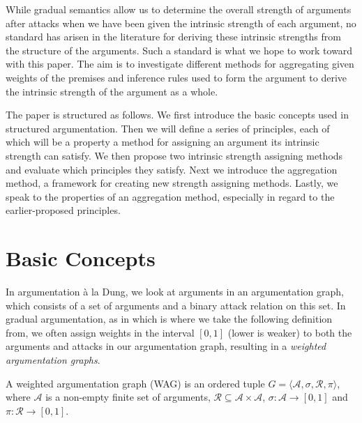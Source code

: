 \documentclass[runningheads]{llncs}
\begin{document}
While gradual semantics allow us to determine the overall strength of arguments after attacks when we have been given the intrinsic strength of each argument, no standard has arisen in the literature for deriving these intrinsic strengths from the structure of the arguments. Such a standard is what we hope to work toward with this paper. The aim is to investigate different methods for aggregating given weights of the premises and inference rules used to form the argument to derive the intrinsic strength of the argument as a whole.

The paper is structured as follows. We first introduce the basic concepts used in structured argumentation. Then we will define a series of principles, each of which will be a property a method for assigning an argument its intrinsic strength can satisfy. We then propose two intrinsic strength assigning methods and evaluate which principles they satisfy. Next we introduce the aggregation method, a framework for creating new strength assigning methods. Lastly, we speak to the properties of an aggregation method, especially in regard to the earlier-proposed principles.
%
\section{Basic Concepts}
In argumentation à la Dung, we look at arguments in an argumentation graph, which consists of a set of arguments and a binary attack relation on this set. In gradual argumentation, as in \cite{DBLP:conf/atal/AmgoudD19} which is where we take the following definition from, we often assign weights in the interval $[0,1]$ (lower is weaker) to both the arguments and attacks in our argumentation graph, resulting in a \textit{weighted argumentation graphs}.

\begin{definition}\label{WAG}
A weighted argumentation graph (WAG) is an ordered tuple $G = \langle \mathcal{A},\sigma, \mathcal{R},\pi\rangle$, where $\mathcal{A}$ is a non-empty finite set of arguments, $\mathcal{R} \subseteq \mathcal{A} \times \mathcal{A}$, $\sigma : \mathcal{A} \rightarrow [0,1]$ and $\pi : \mathcal{R} \rightarrow [0,1]$.
\end{definition}
\end{document}
